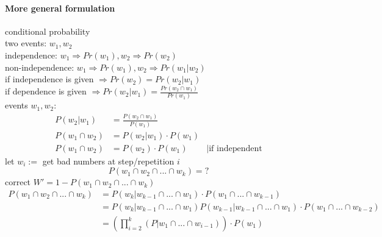 \paragraph{More general formulation} 
conditional probability \\
two events: $w_1,w_2$ \\
independence: $w_1 \Rightarrow Pr(w_1), w_2 \Rightarrow Pr(w_2)$ \\
non-independence: $w_1 \Rightarrow Pr(w_1), w_2 \Rightarrow Pr(w_1|w_2)$ \\
if independence is given $\Rightarrow Pr(w_2) = Pr(w_2|w_1)$ \\
if dependence is given $\Rightarrow Pr(w_2|w_1) = \frac{Pr(w_2 \cap w_1)}{Pr(w_1)}$ \\
events $w_1,w_2$: 
\begin{align*}
P(w_2|w_1) &= \frac{P(w_2 \cap w_1)}{P(w_1)} \\
P(w_1 \cap w_2) &= P(w_2|w_1) \cdot P(w_1) \\
P(w_1 \cap w_2) &= P(w_2) \cdot P(w_1) & | \text{if independent}
\end{align*}
let $w_i := $ get bad numbers at step/repetition $i$
$$P(w_1 \cap w_2 \cap ... \cap w_k) = ?$$ 
correct $W' = 1 -P(w_1 \cap w_2 \cap ... \cap w_k)$
\begin{align*}
	P(w_1 \cap w_2 \cap ... \cap w_k) &= P(w_k|w_{k-1} \cap ... \cap w_1) \cdot P(w_1 \cap ... \cap w_{k-1}) \\
	&= P(w_k|w_{k-1} \cap ... \cap w_1) P(w_{k-1}|w_{k-1} \cap ... \cap w_1) \cdot P(w_1 \cap ... \cap w_{k-2}) \\
	&= \left( \prod_{i=2}^{k} \left(P|w_1 \cap ... \cap w_{i-1} \right) \right) \cdot P(w_1)
\end{align*}
